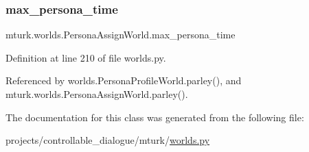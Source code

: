 \subsubsection{\texorpdfstring{max\+\_\+persona\+\_\+time}{max\_persona\_time}}
{\footnotesize\ttfamily mturk.\+worlds.\+Persona\+Assign\+World.\+max\+\_\+persona\+\_\+time}



Definition at line 210 of file worlds.\+py.



Referenced by worlds.\+Persona\+Profile\+World.\+parley(), and mturk.\+worlds.\+Persona\+Assign\+World.\+parley().



The documentation for this class was generated from the following file\+:\begin{DoxyCompactItemize}
\item 
projects/controllable\+\_\+dialogue/mturk/\hyperlink{projects_2controllable__dialogue_2mturk_2worlds_8py}{worlds.\+py}\end{DoxyCompactItemize}
